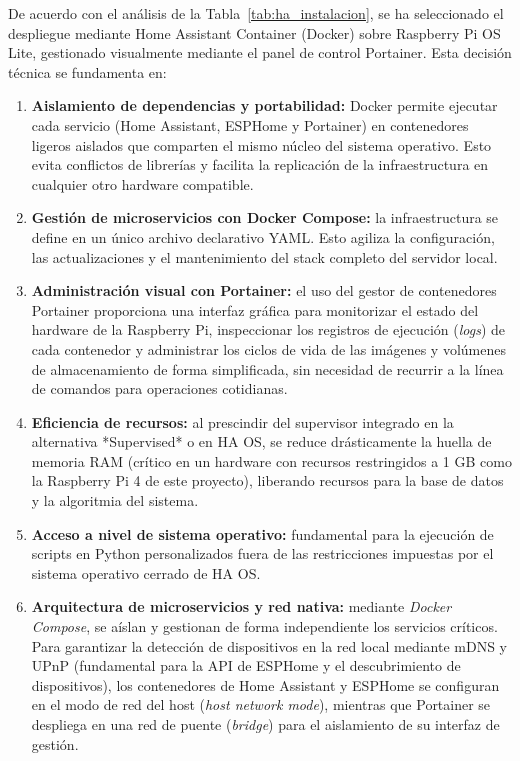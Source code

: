 De acuerdo con el análisis de la Tabla~\ref{tab:ha_instalacion}, se ha seleccionado el despliegue mediante Home Assistant Container (Docker) sobre Raspberry Pi OS Lite, gestionado visualmente mediante el panel de control Portainer. Esta decisión técnica se fundamenta en:
\begin{enumerate}
    \item \textbf{Aislamiento de dependencias y portabilidad:} Docker permite ejecutar cada servicio (Home Assistant, ESPHome y Portainer) en contenedores ligeros aislados que comparten el mismo núcleo del sistema operativo. Esto evita conflictos de librerías y facilita la replicación de la infraestructura en cualquier otro hardware compatible.
    \item \textbf{Gestión de microservicios con Docker Compose:} la infraestructura se define en un único archivo declarativo YAML. Esto agiliza la configuración, las actualizaciones y el mantenimiento del stack completo del servidor local.
    \item \textbf{Administración visual con Portainer:} el uso del gestor de contenedores Portainer proporciona una interfaz gráfica para monitorizar el estado del hardware de la Raspberry Pi, inspeccionar los registros de ejecución (\textit{logs}) de cada contenedor y administrar los ciclos de vida de las imágenes y volúmenes de almacenamiento de forma simplificada, sin necesidad de recurrir a la línea de comandos para operaciones cotidianas.
    \item \textbf{Eficiencia de recursos:} al prescindir del supervisor integrado en la alternativa *Supervised* o en HA OS, se reduce drásticamente la huella de memoria RAM (crítico en un hardware con recursos restringidos a 1 GB como la Raspberry Pi 4 de este proyecto), liberando recursos para la base de datos y la algoritmia del sistema.
    \item \textbf{Acceso a nivel de sistema operativo:} fundamental para la ejecución de scripts en Python personalizados fuera de las restricciones impuestas por el sistema operativo cerrado de HA OS.
    \item \textbf{Arquitectura de microservicios y red nativa:} mediante \textit{Docker Compose}, se aíslan y gestionan de forma independiente los servicios críticos. Para garantizar la detección de dispositivos en la red local mediante mDNS y UPnP (fundamental para la API de ESPHome y el descubrimiento de dispositivos), los contenedores de Home Assistant y ESPHome se configuran en el modo de red del host (\textit{host network mode}), mientras que Portainer se despliega en una red de puente (\textit{bridge}) para el aislamiento de su interfaz de gestión.
\end{enumerate}

